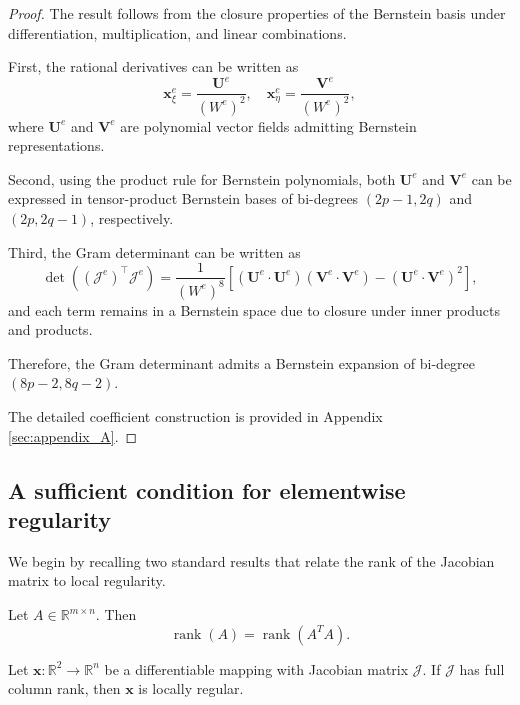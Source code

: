 \documentclass{jssc}
\begin{document}
\begin{proof}
The result follows from the closure properties of the Bernstein basis under differentiation, multiplication, and linear combinations.

First, the rational derivatives can be written as
\[
\bm{x}^e_\xi = \frac{\mathbf{U}^e}{(W^e)^2}, \quad
\bm{x}^e_\eta = \frac{\mathbf{V}^e}{(W^e)^2},
\]
where $\mathbf{U}^e$ and $\mathbf{V}^e$ are polynomial vector fields admitting Bernstein representations.

Second, using the product rule for Bernstein polynomials, both $\mathbf{U}^e$ and $\mathbf{V}^e$ can be expressed in tensor-product Bernstein bases of bi-degrees $(2p-1,2q)$ and $(2p,2q-1)$, respectively.

Third, the Gram determinant can be written as
\[
\det((\bm{\mathcal{J}}^e)^\top \bm{\mathcal{J}}^e)
=
\frac{1}{(W^e)^8}
\left[
(\mathbf{U}^e\cdot\mathbf{U}^e)
(\mathbf{V}^e\cdot\mathbf{V}^e)
-
(\mathbf{U}^e\cdot\mathbf{V}^e)^2
\right],
\]
and each term remains in a Bernstein space due to closure under inner products and products.

Therefore, the Gram determinant admits a Bernstein expansion of bi-degree $(8p-2,8q-2)$.

The detailed coefficient construction is provided in Appendix \ref{sec:appendix_A}.
\end{proof}

\subsection{A sufficient condition for elementwise regularity}

We begin by recalling two standard results that relate the rank of the Jacobian matrix to local regularity.

\begin{lemma}
Let $A \in \mathbb{R}^{m \times n}$. Then
\begin{equation}
    \operatorname{rank}(A) = \operatorname{rank}(A^T A).
\end{equation}
\end{lemma}

\begin{lemma} \citep{knupp2020fundamentals}
Let $\mathbf{x} : \mathbb{R}^2 \to \mathbb{R}^n$ be a differentiable mapping with Jacobian matrix $\bm{\mathcal{J}}$. If $\bm{\mathcal{J}}$ has full column rank, then $\mathbf{x}$ is locally regular.
\label{lemma1}
\end{lemma}
\end{document}
